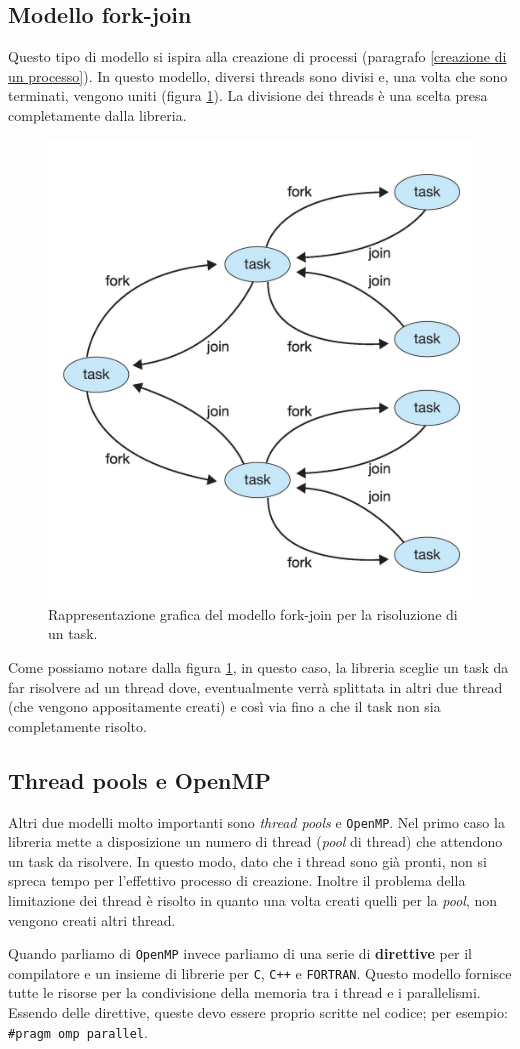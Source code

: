 \subsection{Modello fork-join}
Questo tipo di modello si ispira alla creazione di processi (paragrafo \ref{creazione di un processo}). In questo modello, diversi threads sono divisi e, una volta che sono terminati, vengono uniti (figura \ref{fig:fork_join}). La divisione dei threads è una scelta presa completamente dalla libreria.
\begin{figure}
    \centering
    \includegraphics[width = .4\textwidth]{../res/imgs/threads/fork_join.png}
    \caption{Rappresentazione grafica del modello fork-join per la risoluzione di un task.}
    \label{fig:fork_join}
\end{figure}
Come possiamo notare dalla figura \ref{fig:fork_join}, in questo caso, la libreria sceglie un task da far risolvere ad un thread dove, eventualmente verrà splittata in altri due thread (che vengono appositamente creati) e così via fino a che il task non sia completamente risolto.
% 
\subsection{Thread pools e OpenMP}
Altri due modelli molto importanti sono \textit{thread pools} e \texttt{OpenMP}. Nel primo caso la libreria mette a disposizione un numero di thread (\textit{pool} di thread) che attendono un  task da risolvere. In questo modo, dato che i thread sono già pronti, non si spreca tempo per l'effettivo processo di creazione. Inoltre il problema della limitazione dei thread è risolto in quanto una volta creati quelli per la \textit{pool}, non vengono creati altri thread. 

Quando parliamo di \texttt{OpenMP} invece parliamo di una serie di \textbf{direttive} per il compilatore e un insieme di librerie per \texttt{C}, \texttt{C++} e \texttt{FORTRAN}. Questo modello fornisce tutte le risorse per la condivisione della memoria tra i thread e i parallelismi. Essendo delle direttive, queste devo essere proprio scritte nel codice; per esempio: \texttt{\#pragm omp parallel}.
% 

